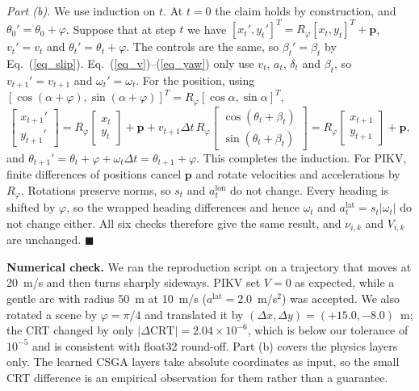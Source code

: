 \documentclass[preprint,12pt]{elsarticle}
\begin{document}
\textit{Part (b).} We use induction on $t$. At $t = 0$ the claim holds by construction, and $\theta_0' = \theta_0 + \varphi$. Suppose that at step $t$ we have $[x_t', y_t']^T = R_\varphi [x_t, y_t]^T + \mathbf{p}$, $v_t' = v_t$ and $\theta_t' = \theta_t + \varphi$. The controls are the same, so $\beta_t' = \beta_t$ by Eq.~(\ref{eq_slip}). Eq.~(\ref{eq_v})--(\ref{eq_yaw}) only use $v_t$, $a_t$, $\delta_t$ and $\beta_t$, so $v_{t+1}' = v_{t+1}$ and $\omega_t' = \omega_t$. For the position, using $[\cos(\alpha + \varphi), \sin(\alpha + \varphi)]^T = R_\varphi [\cos \alpha, \sin \alpha]^T$,
\begin{equation*}
\begin{bmatrix} x_{t+1}' \\ y_{t+1}' \end{bmatrix}
= R_\varphi \begin{bmatrix} x_t \\ y_t \end{bmatrix} + \mathbf{p} + v_{t+1} \Delta t \, R_\varphi \begin{bmatrix} \cos(\theta_t + \beta_t) \\ \sin(\theta_t + \beta_t) \end{bmatrix}
= R_\varphi \begin{bmatrix} x_{t+1} \\ y_{t+1} \end{bmatrix} + \mathbf{p},
\end{equation*}
and $\theta_{t+1}' = \theta_t + \varphi + \omega_t \Delta t = \theta_{t+1} + \varphi$. This completes the induction. For PIKV, finite differences of positions cancel $\mathbf{p}$ and rotate velocities and accelerations by $R_\varphi$. Rotations preserve norms, so $s_t$ and $a^{\text{lon}}_t$ do not change. Every heading is shifted by $\varphi$, so the wrapped heading differences and hence $\omega_t$ and $a^{\text{lat}}_t = s_t |\omega_t|$ do not change either. All six checks therefore give the same result, and $\nu_{i,k}$ and $V_{i,k}$ are unchanged. \hfill $\blacksquare$

\textbf{Numerical check.} We ran the reproduction script on a trajectory that moves at 20~m/s and then turns sharply sideways. PIKV set $V = 0$ as expected, while a gentle arc with radius 50~m at 10~m/s ($a^{\text{lat}} = 2.0$~m/s$^2$) was accepted. We also rotated a scene by $\varphi = \pi/4$ and translated it by $(\Delta x, \Delta y) = (+15.0, -8.0)$~m; the CRT changed by only $|\Delta \text{CRT}| = 2.04 \times 10^{-6}$, which is below our tolerance of $10^{-5}$ and is consistent with float32 round-off. Part (b) covers the physics layers only. The learned CSGA layers take absolute coordinates as input, so the small CRT difference is an empirical observation for them rather than a guarantee.
\end{document}
